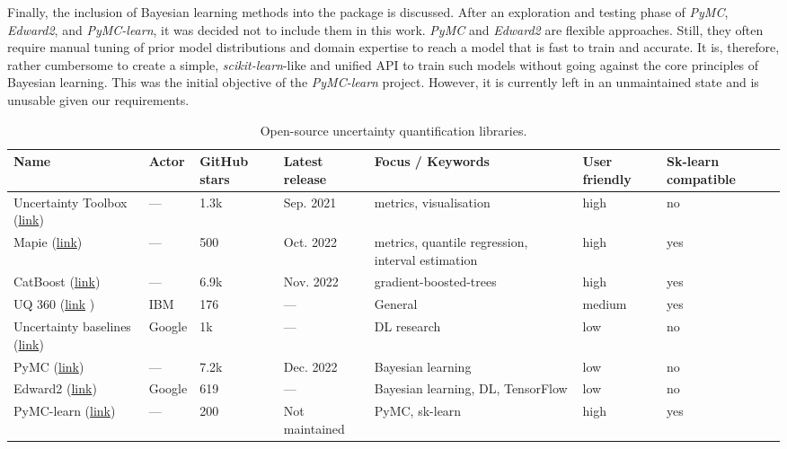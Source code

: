 Finally, the inclusion of Bayesian learning methods into the package is discussed. After an exploration and testing phase of \textit{PyMC}, \textit{Edward2}, and \textit{PyMC-learn}, it was decided not to include them in this work. \textit{PyMC} and \textit{Edward2} are flexible approaches. Still, they often require manual tuning of prior model distributions and domain expertise to reach a model that is fast to train and accurate. It is, therefore, rather cumbersome to create a simple, \textit{scikit-learn}-like and unified API to train such models without going against the core principles of Bayesian learning. This was the initial objective of the \textit{PyMC-learn} project. However, it is currently left in an unmaintained state and is unusable given our requirements.






\begin{table}[htbp]
\centering
\caption{Open-source uncertainty quantification libraries.}
\label{fig:open-source-uq}
\begin{tabular}[t]{p{2.6cm}p{1.4cm}p{1cm}p{1.8cm}p{3.3cm}p{1.5cm}p{2cm}} %
\toprule
Name & Actor & GitHub stars & Latest release & Focus / Keywords & User friendly & Sk-learn compatible\\
\midrule
Uncertainty Toolbox (\href{https://github.com/uncertainty-toolbox/uncertainty-toolbox}{link}) &---& 1.3k &  Sep. 2021 & metrics, visualisation & high & no\\
Mapie (\href{https://github.com/scikit-learn-contrib/MAPIE}{link}) &---& 500 & Oct. 2022 & metrics, quantile regression, interval estimation  & high & yes\\
CatBoost (\href{https://github.com/catboost/catboost}{link})  &---& 6.9k & Nov. 2022 & gradient-boosted-trees & high & yes\\
UQ 360 (\href{https://github.com/IBM/UQ360}{link} ) & IBM & 176 & --- & General & medium & yes \\
Uncertainty baselines (\href{https://github.com/google/uncertainty-baselines}{link}) & Google & 1k & --- & DL research & low & no\\ 
PyMC (\href{https://github.com/pymc-devs/pymc}{link}) &---& 7.2k & Dec. 2022 & Bayesian learning & low & no\\
Edward2 (\href{https://github.com/google/edward2}{link}) & Google & 619 & --- & Bayesian learning, DL, TensorFlow & low & no\\
PyMC-learn (\href{https://github.com/pymc-learn/pymc-learn}{link}) & --- & 200 & Not maintained & PyMC, sk-learn & high & yes \\
\bottomrule
\end{tabular}
\end{table}%